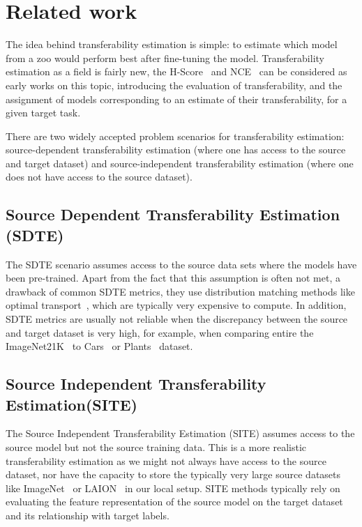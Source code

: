 \section{Related work}
\label{related works}
The idea behind transferability estimation is simple: to estimate which model from a zoo would perform best after fine-tuning the model. Transferability estimation as a field is fairly new, the H-Score~\cite{Hscore} and NCE~\cite{NCE} can be considered as early works on this topic, introducing the evaluation of transferability, and the assignment of models corresponding to an estimate of their transferability, for a given target task. 

There are two widely accepted problem scenarios for transferability estimation: source-dependent transferability estimation (where one has access to the source and target dataset) and source-independent transferability estimation (where one does not have access to the source dataset). 
\subsection{Source Dependent Transferability Estimation (SDTE)}
The SDTE scenario assumes access to the source data sets where the models have been pre-trained.
Apart from the fact that this assumption is often not met, a drawback of common SDTE metrics, they use distribution matching methods like optimal transport~\cite{otce}, which are typically very expensive to compute. In addition, SDTE metrics are usually not reliable when the discrepancy between the source and target dataset is very high, for example, when comparing entire the ImageNet21K~\cite{imagenet} to Cars~\cite{cars} or Plants~\cite{plantvillage} dataset.


\subsection{Source Independent Transferability Estimation(SITE)}
The Source Independent Transferability Estimation (SITE) assumes access to the source model but not the source training data. This is a more realistic transferability estimation as we might not always have access to the source dataset, nor have the capacity to store the typically very large source datasets like ImageNet~\cite{imagenet} or LAION~\cite{schuhmann2022laionb} in our local setup. SITE methods typically rely on evaluating the feature representation of the source model on the target dataset and its relationship with target labels. 

